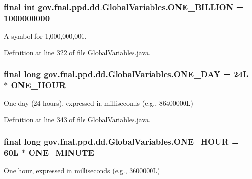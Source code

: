 \hypertarget{classgov_1_1fnal_1_1ppd_1_1dd_1_1GlobalVariables_a271c983add4bac415412025c8ac2f4cc}{
\subsubsection[{O\-N\-E\-\_\-\-B\-I\-L\-L\-I\-O\-N}]{\setlength{\rightskip}{0pt plus 5cm}final int gov.\-fnal.\-ppd.\-dd.\-Global\-Variables.\-O\-N\-E\-\_\-\-B\-I\-L\-L\-I\-O\-N = 1000000000\hspace{0.3cm}{\ttfamily [static]}}}\label{classgov_1_1fnal_1_1ppd_1_1dd_1_1GlobalVariables_a271c983add4bac415412025c8ac2f4cc}
A symbol for 1,000,000,000. 

Definition at line 322 of file Global\-Variables.\-java.

\hypertarget{classgov_1_1fnal_1_1ppd_1_1dd_1_1GlobalVariables_aef5cbdf53c9830ae609987b805a08998}{
\subsubsection[{O\-N\-E\-\_\-\-D\-A\-Y}]{\setlength{\rightskip}{0pt plus 5cm}final long gov.\-fnal.\-ppd.\-dd.\-Global\-Variables.\-O\-N\-E\-\_\-\-D\-A\-Y = 24\-L $\ast$ O\-N\-E\-\_\-\-H\-O\-U\-R\hspace{0.3cm}{\ttfamily [static]}}}\label{classgov_1_1fnal_1_1ppd_1_1dd_1_1GlobalVariables_aef5cbdf53c9830ae609987b805a08998}
One day (24 hours), expressed in milliseconds (e.\-g., 86400000\-L) 

Definition at line 343 of file Global\-Variables.\-java.

\hypertarget{classgov_1_1fnal_1_1ppd_1_1dd_1_1GlobalVariables_a947f75994e24bb52604adf3699920579}{
\subsubsection[{O\-N\-E\-\_\-\-H\-O\-U\-R}]{\setlength{\rightskip}{0pt plus 5cm}final long gov.\-fnal.\-ppd.\-dd.\-Global\-Variables.\-O\-N\-E\-\_\-\-H\-O\-U\-R = 60\-L $\ast$ O\-N\-E\-\_\-\-M\-I\-N\-U\-T\-E\hspace{0.3cm}{\ttfamily [static]}}}\label{classgov_1_1fnal_1_1ppd_1_1dd_1_1GlobalVariables_a947f75994e24bb52604adf3699920579}
One hour, expressed in milliseconds (e.\-g., 3600000\-L) 

